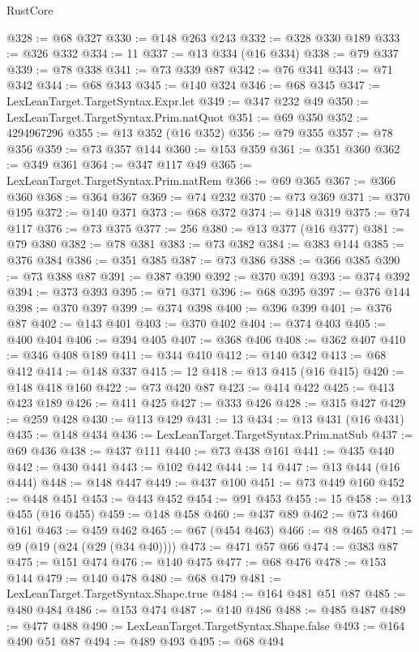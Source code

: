 \begin{lexlean}{RustCore}
\begin{coremodule}
@328 := @68 @327
@330 := @148 @263 @243
@332 := @328 @330 @189
@333 := @326 @332
@334 := 11
@337 := @13 @334 (@16 @334)
@338 := @79 @337
@339 := @78 @338
@341 := @73 @339 @87
@342 := @76 @341
@343 := @71 @342
@344 := @68 @343
@345 := @140 @324
@346 := @68 @345
@347 := LexLeanTarget.TargetSyntax.Expr.let
@349 := @347 @232 @49
@350 := LexLeanTarget.TargetSyntax.Prim.natQuot
@351 := @69 @350
@352 := 4294967296
@355 := @13 @352 (@16 @352)
@356 := @79 @355
@357 := @78 @356
@359 := @73 @357 @144
@360 := @153 @359
@361 := @351 @360
@362 := @349 @361
@364 := @347 @117 @49
@365 := LexLeanTarget.TargetSyntax.Prim.natRem
@366 := @69 @365
@367 := @366 @360
@368 := @364 @367
@369 := @74 @232
@370 := @73 @369
@371 := @370 @195
@372 := @140 @371
@373 := @68 @372
@374 := @148 @319
@375 := @74 @117
@376 := @73 @375
@377 := 256
@380 := @13 @377 (@16 @377)
@381 := @79 @380
@382 := @78 @381
@383 := @73 @382
@384 := @383 @144
@385 := @376 @384
@386 := @351 @385
@387 := @73 @386
@388 := @366 @385
@390 := @73 @388 @87
@391 := @387 @390
@392 := @370 @391
@393 := @374 @392
@394 := @373 @393
@395 := @71 @371
@396 := @68 @395
@397 := @376 @144
@398 := @370 @397
@399 := @374 @398
@400 := @396 @399
@401 := @376 @87
@402 := @143 @401
@403 := @370 @402
@404 := @374 @403
@405 := @400 @404
@406 := @394 @405
@407 := @368 @406
@408 := @362 @407
@410 := @346 @408 @189
@411 := @344 @410
@412 := @140 @342
@413 := @68 @412
@414 := @148 @337
@415 := 12
@418 := @13 @415 (@16 @415)
@420 := @148 @418 @160
@422 := @73 @420 @87
@423 := @414 @422
@425 := @413 @423 @189
@426 := @411 @425
@427 := @333 @426
@428 := @315 @427
@429 := @259 @428
@430 := @113 @429
@431 := 13
@434 := @13 @431 (@16 @431)
@435 := @148 @434
@436 := LexLeanTarget.TargetSyntax.Prim.natSub
@437 := @69 @436
@438 := @437 @111
@440 := @73 @438 @161
@441 := @435 @440
@442 := @430 @441
@443 := @102 @442
@444 := 14
@447 := @13 @444 (@16 @444)
@448 := @148 @447
@449 := @437 @100
@451 := @73 @449 @160
@452 := @448 @451
@453 := @443 @452
@454 := @91 @453
@455 := 15
@458 := @13 @455 (@16 @455)
@459 := @148 @458
@460 := @437 @89
@462 := @73 @460 @161
@463 := @459 @462
@465 := @67 (@454 @463)
@466 := @8 @465
@471 := @9 (@19 (@24 (@29 (@34 @40))))
@473 := @471 @57 @66
@474 := @383 @87
@475 := @151 @474
@476 := @140 @475
@477 := @68 @476
@478 := @153 @144
@479 := @140 @478
@480 := @68 @479
@481 := LexLeanTarget.TargetSyntax.Shape.true
@484 := @164 @481 @51 @87
@485 := @480 @484
@486 := @153 @474
@487 := @140 @486
@488 := @485 @487
@489 := @477 @488
@490 := LexLeanTarget.TargetSyntax.Shape.false
@493 := @164 @490 @51 @87
@494 := @489 @493
@495 := @68 @494

\end{coremodule}
\end{lexlean}
